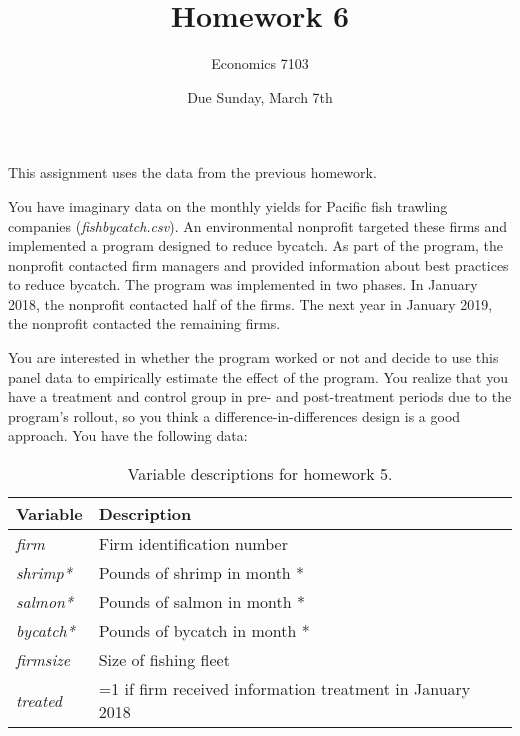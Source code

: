 \documentclass{article}
\title{Homework 6}
\author{Economics 7103}
\date{Due Sunday, March 7th}
\begin{document}
  
\maketitle

\noindent This assignment uses the data from the previous homework.

You have imaginary data on the monthly yields for Pacific fish trawling companies (\textit{fishbycatch.csv}).  An environmental nonprofit targeted these firms and implemented a program designed to reduce bycatch.  As part of the program, the nonprofit contacted firm managers and provided information about best practices to reduce bycatch.  The program was implemented in two phases.  In January 2018, the nonprofit contacted half of the firms.  The next year in January 2019, the nonprofit contacted the remaining firms.

You are interested in whether the program worked or not and decide to use this panel data to empirically estimate the effect of the program.  You realize that you have a treatment and control group in pre- and post-treatment periods due to the program's rollout, so you think a difference-in-differences design is a good approach.  You have the following data:

\begin{table}[h]
    \centering
    \begin{tabular}{l|l}
        Variable & Description \\ \hline
         \textit{firm} & Firm identification number  \\
         \textit{shrimp*} & Pounds of shrimp in month * \\
         \textit{salmon*} & Pounds of salmon in month * \\
         \textit{bycatch*} & Pounds of bycatch in month * \\
         \textit{firmsize} & Size of fishing fleet \\
         \textit{treated} & =1 if firm received information treatment in January 2018 \\
    \end{tabular}
    \caption{Variable descriptions for homework 5.}
    \label{tab:variables4}
\end{table}
\end{document}

